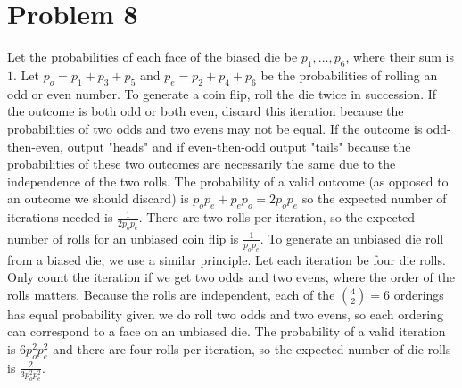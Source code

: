 \documentclass[11pt]{article}
\newcommand{\asdf}{\newline\newline}
\begin{document}
\newpage
\section*{Problem 8}
Let the probabilities of each face of the biased die be $p_1,\ldots,p_6$, where their sum is $1$. Let $p_o = p_1+p_3+p_5$ and $p_e = p_2+p_4+p_6$ be the probabilities of rolling an odd or even number. To generate a coin flip, roll the die twice in succession. If the outcome is both odd or both even, discard this iteration because the probabilities of two odds and two evens may not be equal. If the outcome is odd-then-even, output "heads" and if even-then-odd output "tails" because the probabilities of these two outcomes are necessarily the same due to the independence of the two rolls. \asdf
The probability of a valid outcome (as opposed to an outcome we should discard) is $p_op_e + p_ep_o = 2p_op_e$ so the expected number of iterations needed is $\frac1{2p_op_e}$. There are two rolls per iteration, so the expected number of rolls for an unbiased coin flip is $\frac1{p_op_e}$. \asdf
To generate an unbiased die roll from a biased die, we use a similar principle. Let each iteration be four die rolls. Only count the iteration if we get two odds and two evens, where the order of the rolls matters. Because the rolls are independent, each of the ${4 \choose 2}=6$ orderings has equal probability given we do roll two odds and two evens, so each ordering can correspond to a face on an unbiased die. \asdf
The probability of a valid iteration is $6p_o^2p_e^2$ and there are four rolls per iteration, so the expected number of die rolls is $\frac2{3p_o^2p_e^2}$.
\end{document}
